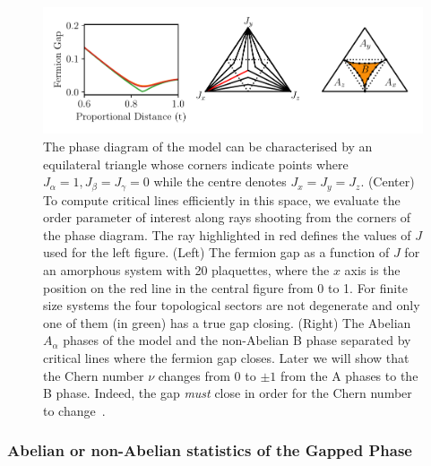 \hypertarget{fig:phase_diagram}{%
\begin{figure}
\centering
\includegraphics[width=1\textwidth,height=\textheight]{figure_code/amk_chapter/results/phase_diagram/phase_diagram}
\caption[{The Ground State Phase Diagram}]{The phase diagram of the model can be characterised by an equilateral triangle whose corners indicate points where \(J_\alpha = 1, J_\beta = J_\gamma = 0\) while the centre denotes \(J_x = J_y = J_z\). (Center) To compute critical lines efficiently in this space, we evaluate the order parameter of interest along rays shooting from the corners of the phase diagram. The ray highlighted in red defines the values of \(J\) used for the left figure. (Left) The fermion gap as a function of \(J\) for an amorphous system with 20 plaquettes, where the \(x\) axis is the position on the red line in the central figure from 0 to 1. For finite size systems the four topological sectors are not degenerate and only one of them (in green) has a true gap closing. (Right) The Abelian \(A_\alpha\) phases of the model and the non-Abelian B phase separated by critical lines where the fermion gap closes. Later we will show that the Chern number \(\nu\) changes from \(0\) to \(\pm 1\) from the A phases to the B phase. Indeed, the gap \emph{must} close in order for the Chern number to change~\autocite{ezawaTopologicalPhaseTransition2013}.}
\label{fig:phase_diagram}
\end{figure}
}

\hypertarget{abelian-or-non-abelian-statistics-of-the-gapped-phase}{%
\subsubsection{Abelian or non-Abelian statistics of the Gapped Phase}\label{abelian-or-non-abelian-statistics-of-the-gapped-phase}}

